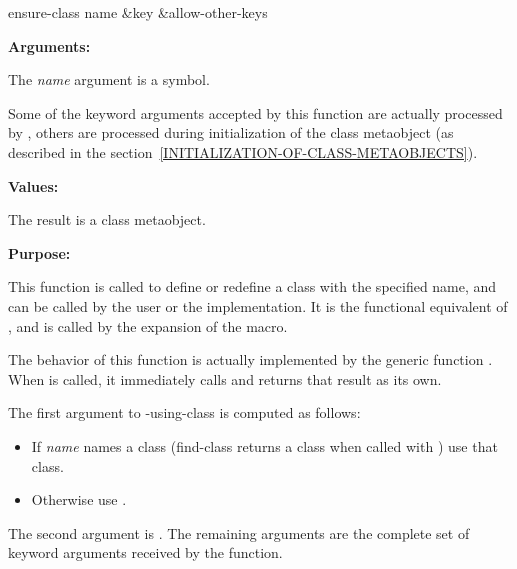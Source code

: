 \begin{defun}[Function]
ensure-class name &key &allow-other-keys

\textbf{Arguments:}

The \emph{name} argument is a symbol.

Some of the keyword arguments accepted by this function are actually processed
by , others are processed during initialization of
the class metaobject (as described in the
section~\ref{INITIALIZATION-OF-CLASS-METAOBJECTS}).

\textbf{Values:}

The result is a class metaobject.

\textbf{Purpose:}

This function is called to define or redefine a class with the specified name,
and can be called by the user or the implementation. It is the functional
equivalent of , and is called by the expansion of the
 macro.

The behavior of this function is actually implemented by the generic function
. When  is called, it
immediately calls  and returns that result as its
own.

The first argument to -using-class is computed as follows:

\begin{itemize}
\item 
  If \emph{name} names a class (find-class returns a class when called with ) use that class.
\item 
  Otherwise use .
\end{itemize}

The second argument is . The remaining arguments are the complete set of
keyword arguments received by the  function.
\end{defun}

